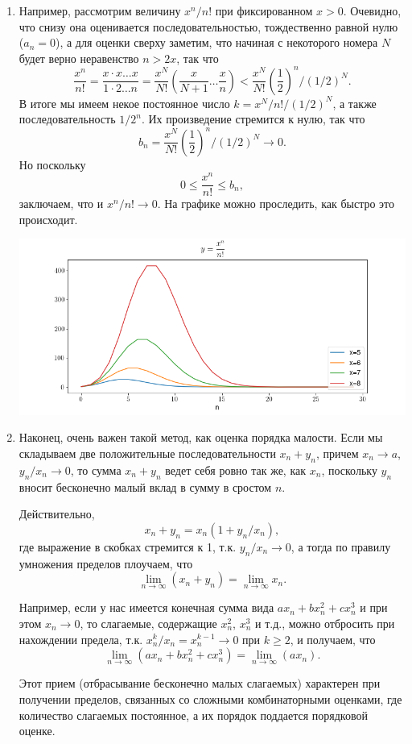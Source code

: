 \begin{enumerate}
\item Например, рассмотрим величину $x^n/n!$ при фиксированном $x>0$. Очевидно, что снизу она оценивается последовательностью, тождественно равной нулю ($a_n=0$), а для оценки сверху заметим, что начиная с некоторого номера $N$ будет верно неравенство $n>2x$, так что
$$
\frac{x^n}{n!}=\frac{x\cdot x\dots x}{1\cdot 2\dots n}=\frac{x^N}{N!}\left(\frac{x}{N+1}\dots\frac{x}{n}\right)<
\frac{x^N}{N!}\left(\frac 12\right)^{n}/(1/2)^N.
$$
В итоге мы имеем некое постоянное число $k=x^N/n!/(1/2)^N$, а также последовательность $1/2^n$. Их произведение стремится к нулю, так что
$$
b_n=\frac{x^N}{N!}\left(\frac 12\right)^{n}/(1/2)^N\to 0.
$$
Но поскольку 
$$
0\le\frac{x^n}{n!}\le b_n,
$$
заключаем, что и $x^n/n!\to 0$. На графике можно проследить, как быстро это происходит.
\begin{center}
\includegraphics[scale=0.5]{fact.png}
\end{center}


\item Наконец, очень важен такой метод, как оценка порядка малости. Если мы складываем две положительные последовательности $x_n+y_n$, причем $x_n\to a$, $y_n/x_n\to 0$, то сумма $x_n+y_n$ ведет себя ровно так же, как $x_n$, поскольку $y_n$ вносит бесконечно малый вклад в сумму в сростом $n$.

Действительно,
$$
x_n+y_n=x_n(1+y_n/x_n),
$$
где выражение в скобках стремится к 1, т.к. $y_n/x_n\to 0$, а тогда по правилу умножения пределов плоучаем, что
$$
\lim_{n\to\infty} (x_n+y_n)=\lim_{n\to\infty} x_n.
$$

Например, если у нас имеется конечная сумма вида $ax_n+bx_n^2+cx_n^3$ и при этом $x_n\to 0$, то слагаемые, содержащие $x_n^2$, $x_n^3$ и т.д., можно отбросить при нахождении предела, т.к. $x_n^k/x_n=x_n^{k-1}\to 0$ при $k\ge 2$, и получаем, что
$$
\lim_{n\to\infty}(ax_n+bx_n^2+cx_n^3) = \lim_{n\to\infty} (ax_n).
$$

Этот прием (отбрасывание бесконечно малых слагаемых) характерен при получении пределов, связанных со сложными комбинаторными оценками, где количество слагаемых постоянное, а их порядок поддается порядковой оценке.



\end{enumerate}
